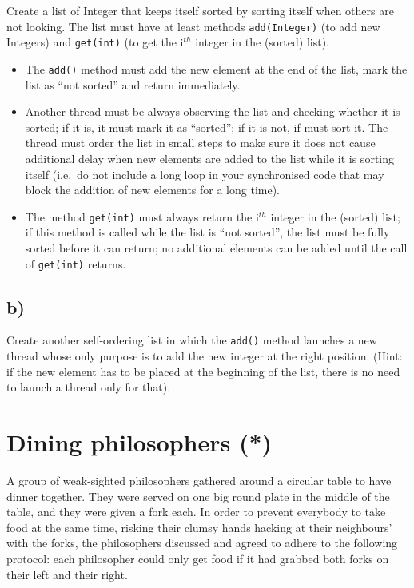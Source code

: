 \documentclass{article}
\begin{document}
Create a list of Integer that keeps itself sorted by sorting itself
when others are not looking. The list must have at least methods
\verb+add(Integer)+ (to add new Integers) and \verb+get(int)+ (to get
the i$^{th}$ integer in the (sorted) list). 

\begin{itemize}
\item The \verb+add()+ method must add the new element at the end
  of the list, mark the list as ``not sorted'' and return immediately.
\item Another thread must be always observing the list and checking whether
  it is sorted; if it is, it must mark it as ``sorted''; if it is
  not, if must sort it. The thread must order the list in small steps
  to make sure it does not cause additional delay when new elements
  are added to the list while it is sorting itself (i.e.~do not
  include a long loop in your synchronised code that may block the
  addition of new elements for a long time).
\item The method \verb+get(int)+ must always return the i$^{th}$
  integer in the (sorted) list; if this method is called while the
  list is ``not sorted'', the list must be fully sorted before it can
  return; no additional elements can be added until the call of
  \verb+get(int)+ returns.
\end{itemize}

\subsection{b)}
\label{sec:b}

Create another self-ordering list in which the \verb+add()+ method
launches a new thread whose only purpose is to add the new integer at
the right position. (Hint: if the new element has to be placed at the
beginning of the list, there is no need to launch a thread only for
that). 


\section{Dining philosophers (*)}
\label{sec:dining-philosophers}

A group of weak-sighted philosophers gathered around a circular table
to have dinner together. They were served on one big round plate in
the middle of the table, and they were given a fork each. In order to
prevent everybody to take food at the same time, risking their clumsy
hands hacking at their neighbours' with the forks, 
the philosophers discussed and agreed to adhere to the following
protocol: each philosopher could only get food if it had grabbed both
forks on their left and their right. 
\end{document}

